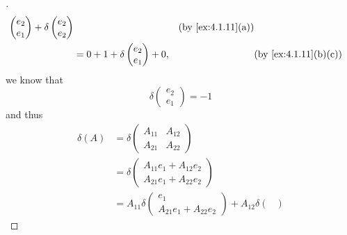 \begin{proof}[]
\begin{align*}
\begin{pmatrix}
                                                              e_2 \\
                                                              e_1
                                                            \end{pmatrix} + \delta\begin{pmatrix}
                                                                                    e_2 \\
                                                                                    e_2
                                                                                  \end{pmatrix} &  & \text{(by \cref{ex:4.1.11}(a))} \\
      & = 0 + 1 + \delta\begin{pmatrix}
                          e_2 \\
                          e_1
                        \end{pmatrix} + 0,       &  & \text{(by \cref{ex:4.1.11}(b)(c))}
  \end{align*}
  we know that
  \[
    \delta\begin{pmatrix}
      e_2 \\
      e_1
    \end{pmatrix} = -1
  \]
  and thus
  \begin{align*}
    \delta(A) & = \delta\begin{pmatrix}
                          A_{1 1} & A_{1 2} \\
                          A_{2 1} & A_{2 2}
                        \end{pmatrix}                                                                                                   \\
              & = \delta\begin{pmatrix}
                          A_{1 1} e_1 + A_{1 2} e_2 \\
                          A_{2 1} e_1 + A_{2 2} e_2
                        \end{pmatrix}                                                                                           \\
              & = A_{1 1} \delta\begin{pmatrix}
                                  e_1 \\
                                  A_{2 1} e_1 + A_{2 2} e_2
                                \end{pmatrix} + A_{1 2} \delta\begin{pmatrix}

\end{pmatrix}
\end{align*}
\end{proof}
